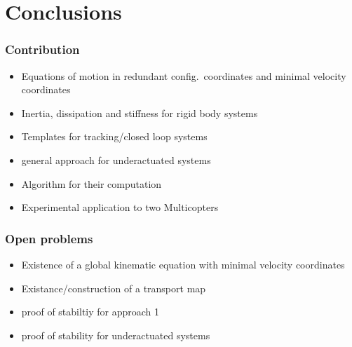\chapter{Conclusions}
\subsection*{Contribution}
\begin{itemize}
 \item Equations of motion in redundant config.\ coordinates and minimal velocity coordinates
 \item Inertia, dissipation and stiffness for rigid body systems
 \item Templates for tracking/closed loop systems
 \item general approach for underactuated systems
 \item Algorithm for their computation
 \item Experimental application to two Multicopters
\end{itemize}

\subsection*{Open problems}
\begin{itemize}
 \item Existence of a global kinematic equation with minimal velocity coordinates
 \item Existance/construction of a transport map
 \item proof of stabiltiy for approach 1
 \item proof of stability for underactuated systems
\end{itemize}